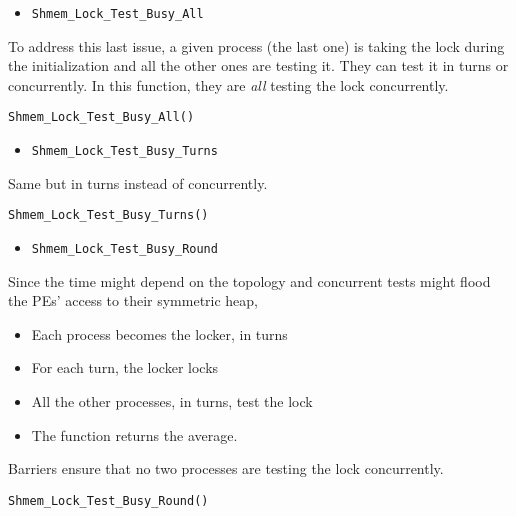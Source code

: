 \documentclass[12pt, letterpaper]{article}
\begin{document}
\begin{itemize}
    \item {\tt Shmem\_Lock\_Test\_Busy\_All}
\end{itemize}

To address this last issue, a given process (the last one) is taking the lock during the initialization and all the other ones are testing it. They can test it in turns or concurrently. In this function, they are \emph{all} testing the lock concurrently.


\begin{lstlisting}
Shmem_Lock_Test_Busy_All()
\end{lstlisting}

\begin{itemize}
    \item {\tt Shmem\_Lock\_Test\_Busy\_Turns}
\end{itemize}

Same but in turns instead of concurrently.

\begin{lstlisting}
Shmem_Lock_Test_Busy_Turns()
\end{lstlisting}

\begin{itemize}
    \item {\tt Shmem\_Lock\_Test\_Busy\_Round}
\end{itemize}

Since the time might depend on the topology and concurrent tests might flood the PEs' access to their symmetric heap,

\begin{itemize}
\item Each process becomes the locker, in turns
\item For each turn, the locker locks
\item All the other processes, in turns, test the lock
\item The function returns the average.
\end{itemize}
Barriers ensure that no two processes are testing the lock concurrently.

\begin{lstlisting}
Shmem_Lock_Test_Busy_Round()
\end{lstlisting}
\end{document}
